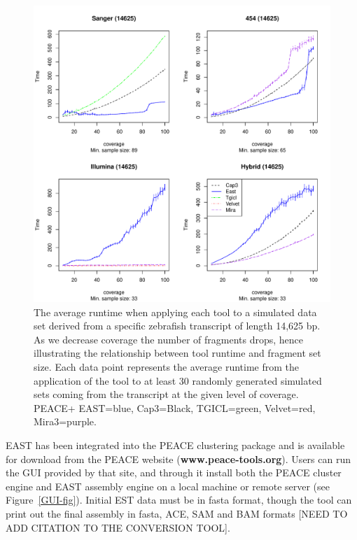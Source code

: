 \documentclass[10pt]{bmc_article}
\newcommand{\peace} {{\small PEACE}}
\newcommand{\capthree} {{\small Cap3}}
\newcommand{\tgicl} {{\small TGICL}}
\newcommand{\east} {{\small EAST}}
\newcommand{\velvet}{{\small Velvet}}
\newcommand{\mira}{{\small Mira3}}
\newenvironment{bmcformat}{\begin{raggedright}\baselineskip20pt\sloppy\setboolean{publ}{false}}{\end{raggedright}\baselineskip20pt\sloppy}
\begin{document}
\begin{bmcformat}
\begin{figure}[htb]
\centerline{\includegraphics[width=6in]{pics.d/runtime_bycoverage_all.pdf}}
\caption{The average runtime when applying each tool to a simulated
  data set derived from a specific zebrafish transcript of length
  14,625 bp.  As we decrease coverage the number of fragments drops,
  hence illustrating the relationship between tool runtime and
  fragment set size.  Each data point represents the average runtime
  from the application of the tool to at least 30 randomly generated
  simulated sets coming from the transcript at the given level of coverage.
  \peace + \east=blue, \capthree=Black, \tgicl=green,
  \velvet=red, \mira=purple.}
\label{runtime.coverage}
\end{figure}

 \east\/ has been integrated into the
\peace\/ clustering package \cite{Rao10} and is available for
download from the \peace\/ website ({\bf www.peace-tools.org}).
Users can run the GUI provided by that site, and through it
install both the \peace\/ cluster engine and \east\/ assembly engine
on a local machine or remote server (see Figure~\ref{GUI-fig}).
Initial EST data must be in fasta format, though the tool can print
out the final assembly in fasta, ACE, SAM and BAM formats [NEED TO ADD
CITATION TO THE CONVERSION TOOL].


\end{bmcformat}
\end{document}
